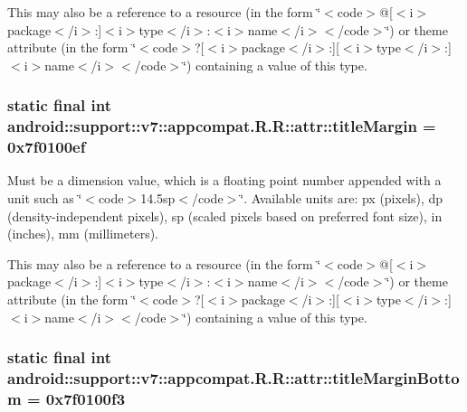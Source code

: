 This may also be a reference to a resource (in the form \char`\"{}$<$code$>$@\mbox{[}$<$i$>$package$<$/i$>$:\mbox{]}$<$i$>$type$<$/i$>$:$<$i$>$name$<$/i$>$$<$/code$>$\char`\"{}) or theme attribute (in the form \char`\"{}$<$code$>$?\mbox{[}$<$i$>$package$<$/i$>$:\mbox{]}\mbox{[}$<$i$>$type$<$/i$>$:\mbox{]}$<$i$>$name$<$/i$>$$<$/code$>$\char`\"{}) containing a value of this type. \hypertarget{classandroid_1_1support_1_1v7_1_1appcompat_1_1_r_1_1attr_a954552e278c499393c9f4eda1414a2e}{
\subsubsection[{titleMargin}]{\setlength{\rightskip}{0pt plus 5cm}static final int android::support::v7::appcompat.R.R::attr::titleMargin = 0x7f0100ef}}
\label{classandroid_1_1support_1_1v7_1_1appcompat_1_1_r_1_1attr_a954552e278c499393c9f4eda1414a2e}


Must be a dimension value, which is a floating point number appended with a unit such as \char`\"{}$<$code$>$14.5sp$<$/code$>$\char`\"{}. Available units are: px (pixels), dp (density-independent pixels), sp (scaled pixels based on preferred font size), in (inches), mm (millimeters). 

This may also be a reference to a resource (in the form \char`\"{}$<$code$>$@\mbox{[}$<$i$>$package$<$/i$>$:\mbox{]}$<$i$>$type$<$/i$>$:$<$i$>$name$<$/i$>$$<$/code$>$\char`\"{}) or theme attribute (in the form \char`\"{}$<$code$>$?\mbox{[}$<$i$>$package$<$/i$>$:\mbox{]}\mbox{[}$<$i$>$type$<$/i$>$:\mbox{]}$<$i$>$name$<$/i$>$$<$/code$>$\char`\"{}) containing a value of this type. \hypertarget{classandroid_1_1support_1_1v7_1_1appcompat_1_1_r_1_1attr_9128f48f3058b589aaf068134845268c}{
\subsubsection[{titleMarginBottom}]{\setlength{\rightskip}{0pt plus 5cm}static final int android::support::v7::appcompat.R.R::attr::titleMarginBottom = 0x7f0100f3}}
\label{classandroid_1_1support_1_1v7_1_1appcompat_1_1_r_1_1attr_9128f48f3058b589aaf068134845268c}



